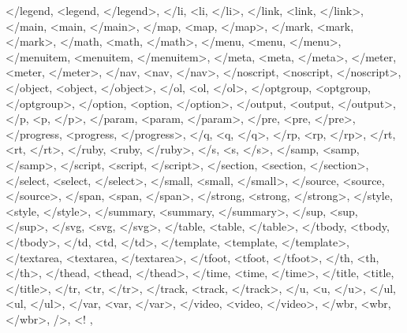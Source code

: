 {{    </legend, <legend, </legend>,
    </li, <li, </li>,
    </link, <link, </link>,
    </main, <main, </main>,
    </map, <map, </map>,
    </mark, <mark, </mark>,
    </math, <math, </math>,
    </menu, <menu, </menu>,
    </menuitem, <menuitem, </menuitem>,
    </meta, <meta, </meta>,
    </meter, <meter, </meter>,
    </nav, <nav, </nav>,
    </noscript, <noscript, </noscript>,
    </object, <object, </object>,
    </ol, <ol, </ol>,
    </optgroup, <optgroup, </optgroup>,
    </option, <option, </option>,
    </output, <output, </output>,
    </p, <p, </p>,
    </param, <param, </param>,
    </pre, <pre, </pre>,
    </progress, <progress, </progress>,
    </q, <q, </q>,
    </rp, <rp, </rp>,
    </rt, <rt, </rt>,
    </ruby, <ruby, </ruby>,
    </s, <s, </s>,
    </samp, <samp, </samp>,
    </script, <script, </script>,
    </section, <section, </section>,
    </select, <select, </select>,
    </small, <small, </small>,
    </source, <source, </source>,
    </span, <span, </span>,
    </strong, <strong, </strong>,
    </style, <style, </style>,
    </summary, <summary, </summary>,
    </sup, <sup, </sup>,
    </svg, <svg, </svg>,
    </table, <table, </table>,
    </tbody, <tbody, </tbody>,
    </td, <td, </td>,
    </template, <template, </template>,
    </textarea, <textarea, </textarea>,
    </tfoot, <tfoot, </tfoot>,
    </th, <th, </th>,
    </thead, <thead, </thead>,
    </time, <time, </time>,
    </title, <title, </title>,
    </tr, <tr, </tr>,
    </track, <track, </track>,
    </u, <u, </u>,
    </ul, <ul, </ul>,
    </var, <var, </var>,
    </video, <video, </video>,
    </wbr, <wbr, </wbr>,
    />, <!
  },
}
